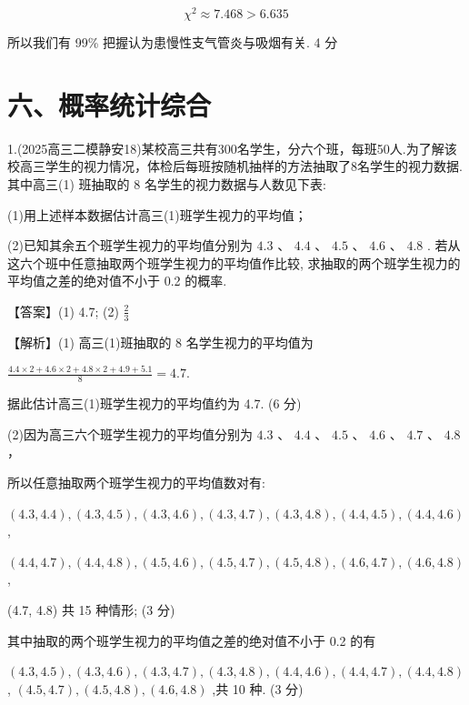 \documentclass[10pt]{article}
\begin{document}
\[
{\chi }^{2} \approx  {7.468} > {6.635}
\]

所以我们有 99\% 把握认为患慢性支气管炎与吸烟有关. 4 分

\section*{六、概率统计综合}

1.(2025高三二模静安18)某校高三共有300名学生，分六个班，每班50人.为了解该校高三学生的视力情况，体检后每班按随机抽样的方法抽取了8名学生的视力数据. 其中高三(1) 班抽取的 8 名学生的视力数据与人数见下表:

(1)用上述样本数据估计高三(1)班学生视力的平均值；

(2)已知其余五个班学生视力的平均值分别为 \({4.3}\text{ 、 }{4.4}\text{ 、 }{4.5}\text{ 、 }{4.6}\text{ 、 }{4.8}\) . 若从这六个班中任意抽取两个班学生视力的平均值作比较, 求抽取的两个班学生视力的平均值之差的绝对值不小于 0.2 的概率.

【答案】(1) 4.7; (2) \(\frac{2}{3}\)

【解析】(1) 高三(1)班抽取的 8 名学生视力的平均值为

\(\frac{{4.4} \times  2 + {4.6} \times  2 + {4.8} \times  2 + {4.9} + {5.1}}{8} = {4.7}.\)

据此估计高三(1)班学生视力的平均值约为 4.7. (6 分)

(2)因为高三六个班学生视力的平均值分别为 \({4.3}\text{ 、 }{4.4}\text{ 、 }{4.5}\text{ 、 }{4.6}\text{ 、 }{4.7}\text{ 、 }{4.8}\) ，

所以任意抽取两个班学生视力的平均值数对有:

\(\left( {{4.3},{4.4}}\right) ,\left( {{4.3},{4.5}}\right) ,\left( {{4.3},{4.6}}\right) ,\left( {{4.3},{4.7}}\right) ,\left( {{4.3},{4.8}}\right) ,\left( {{4.4},{4.5}}\right) ,\left( {{4.4},{4.6}}\right)\) ,

\(\left( {{4.4},{4.7}}\right) ,\left( {{4.4},{4.8}}\right) ,\left( {{4.5},{4.6}}\right) ,\left( {{4.5},{4.7}}\right) ,\left( {{4.5},{4.8}}\right) ,\left( {{4.6},{4.7}}\right) ,\left( {{4.6},{4.8}}\right)\) ,

(4.7, 4.8) 共 15 种情形; (3 分)

其中抽取的两个班学生视力的平均值之差的绝对值不小于 0.2 的有

\(\left( {{4.3},{4.5}}\right) ,\left( {{4.3},{4.6}}\right) ,\left( {{4.3},{4.7}}\right) ,\left( {{4.3},{4.8}}\right) ,\left( {{4.4},{4.6}}\right) ,\left( {{4.4},{4.7}}\right) ,\left( {{4.4},{4.8}}\right)\) , \(\left( {{4.5},{4.7}}\right) ,\left( {{4.5},{4.8}}\right) ,\left( {{4.6},{4.8}}\right)\) ,共 10 种. (3 分)
\end{document}
